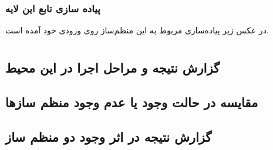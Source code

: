 \documentclass{article}
\begin{document}
\subsubsection{پیاده سازی تابع این لایه}
در عکس زیر پیاده‌سازی مربوط به این منظم‌ساز روی ورودی خود آمده است.
\section{}
\subsection{گزارش نتیجه و مراحل اجرا در این محیط}
\subsection{مقایسه در حالت وجود یا عدم وجود منظم ساز‌ها}
\subsection{گزارش نتیجه در اثر وجود دو منظم ساز}

\section{}
\end{document}
